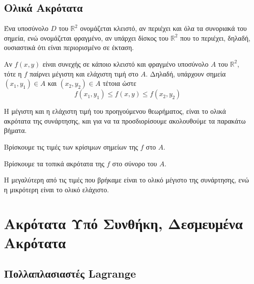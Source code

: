 \section{Ολικά Ακρότατα}

Ένα υποσύνολο $D$ του $ \mathbb{R}^{2} $ ονομάζεται κλειστό, αν περιέχει και όλα 
τα συνοριακά του σημεία, ενώ ονομάζεται φραγμένο, αν υπάρχει δίσκος του 
$ \mathbb{R}^{2} $ που το περιέχει, δηλαδή, ουσιαστικά ότι είναι περιορισμένο σε έκταση.

\begin{thm}
    Αν $f(x,y)$ είναι συνεχής σε κάποιο κλειστό και φραγμένο υποσύνολο $A$ του $
    \mathbb{R}^{2} $, τότε η $f$ παίρνει μέγιστη και ελάχιστη τιμή στο $A$. Δηλαδή, 
    υπάρχουν σημεία $ (x_{1}, y_{1}) \in A $ και $ (x_{2}, y_{2}) \in A $ τέτοια ώστε 
    \[
        f(x_{1}, y_{1}) \leq f(x,y) \leq f(x_{2}, y_{2})
    \]
\end{thm}

Η μέγιστη και η ελάχιστη τιμή του προηγούμενου θεωρήματος, είναι το ολικά ακρότατα 
της συνάρτησης, και για να τα προσδιορίσουμε ακολουθούμε τα παρακάτω βήματα.

\begin{myitemize}
    \item Βρίσκουμε τις τιμές των κρίσιμων σημείων της $f$ στο $A$.
    \item Βρίσκουμε τα τοπικά ακρότατα της $f$ στο σύνορο του $A$. 
    \item Η μεγαλύτερη από τις τιμές που βρήκαμε είναι το ολικό μέγιστο της 
        συνάρτησης, ενώ η μικρότερη είναι το ολικό ελάχιστο.
\end{myitemize}

\chapter{Ακρότατα Υπό Συνθήκη, Δεσμευμένα Ακρότατα}

\section{Πολλαπλασιαστές Lagrange}

